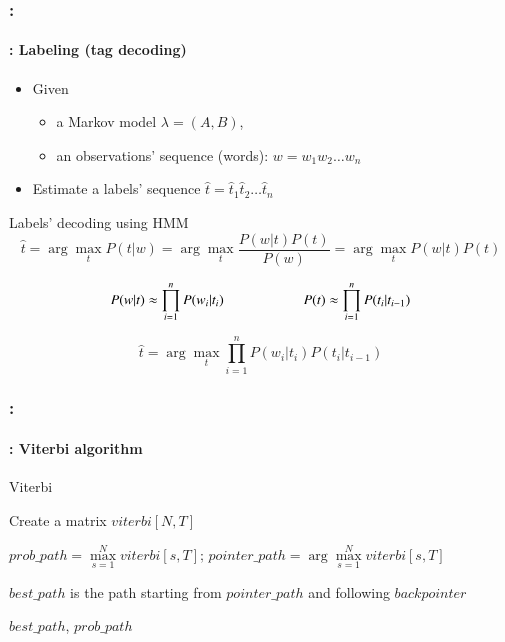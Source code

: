 \documentclass[xcolor=table]{beamer}
\begin{document}
\begin{frame}
	\frametitle{\insertshortsubtitle: \insertsection}
	\framesubtitle{\insertsubsection: Labeling (tag decoding)}
	
	\begin{itemize}
		\item Given
		\begin{itemize}
			\item a Markov model $\lambda = (A, B)$,
			\item an observations' sequence (words): $w = w_1 w_2 \ldots w_n$
		\end{itemize}
		\item Estimate a labels' sequence $\hat{t} = \hat{t}_1 \hat{t}_2 \ldots \hat{t}_n$
	\end{itemize}
	
	\begin{block}{Labels' decoding using HMM}
		\[
		\hat{t} = \arg\max\limits_t P(t | w) = \arg\max\limits_t \frac{P(w|t) P(t)}{P(w)} = \arg\max\limits_t P(w|t) P(t)%
		\]
		
		\[ 
		P(w | t) \approx \prod\limits_{i=1}^n P(w_i|t_i) 
		\hskip2cm
		P(t) \approx \prod\limits_{i=1}^n P(t_i|t_{i-1}) 
		\]
		
		\[
		\hat{t} = \arg\max\limits_t \prod\limits_{i=1}^n P(w_i|t_i) P(t_i|t_{i-1})
		\]
	\end{block}
\end{frame}

\begin{frame}
	\frametitle{\insertshortsubtitle: \insertsection}
	\framesubtitle{\insertsubsection: Viterbi algorithm}
	
	\begin{block}{Viterbi}
		\scriptsize
		\begin{algorithm}[H]
			
			Create a matrix $viterbi[N, T]$\;
			
			
			
			$prob\_path = \max\limits_{s=1}^N viterbi[s, T];\, pointer\_path = \arg\max\limits_{s=1}^N viterbi[s, T]$\;
			
			$best\_path$ is the path starting from $pointer\_path$ and following $backpointer$
			
			\Return $best\_path$, $prob\_path$\;
			
		\end{algorithm}
	\end{block}
	
\end{frame}
\end{document}
